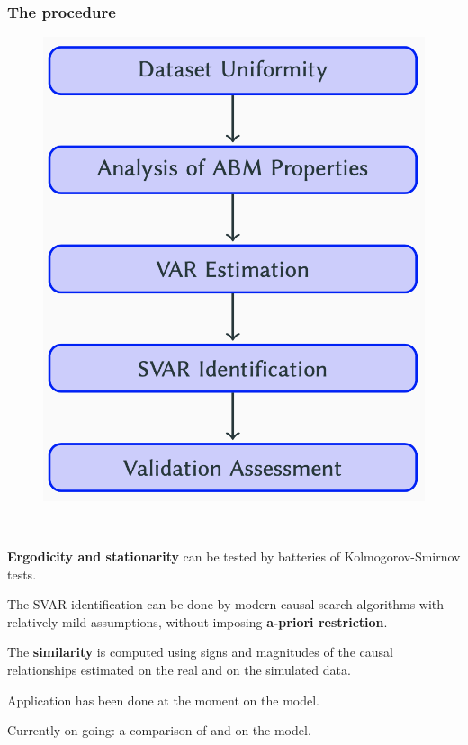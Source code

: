 \documentclass[10pt]{beamer}
\begin{document}
\begin{frame}[c]\frametitle{The procedure}
	\medskip
    \begin{minipage}{0.45\textwidth}
	    \begin{figure}\centering
	    	\includegraphics[scale=.35]{figures/guerini_2017_procedure.png}
	    \end{figure}
    \end{minipage}~
    \begin{minipage}{0.5\textwidth}
    	\alert{\textbf{Ergodicity and stationarity}} can be tested by batteries of Kolmogorov-Smirnov tests. \medskip

    	The SVAR identification can be done by modern causal search algorithms with relatively mild assumptions, without imposing \alert{\textbf{a-priori restriction}}. \medskip

    	The \alert{\textbf{similarity}} is computed using signs and magnitudes of the causal relationships estimated on the real and on the simulated data.
    \end{minipage} \medskip

    Application has been done at the moment on the \citet{dosi2015fiscal} model. \smallskip

    Currently on-going: a comparison of \citet{grazzini2017bayesian} and \citet{guerini2017validation} on the \citet{delligatti2015jeic} model.
\end{frame}
\end{document}

